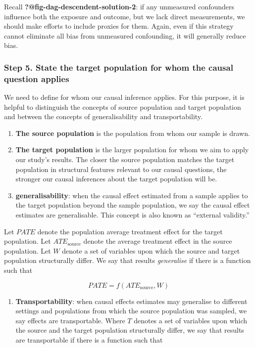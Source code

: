 \documentclass[
  singlecolumn]{article}
\providecommand{\tightlist}{%
  \setlength{\itemsep}{0pt}\setlength{\parskip}{0pt}}\usepackage{longtable,booktabs,array}
\begin{document}
Recall \textbf{?@fig-dag-descendent-solution-2}: if any unmeasured
confounders influence both the exposure and outcome, but we lack direct
measurements, we should make efforts to include proxies for them. Again,
even if this strategy cannot eliminate all bias from unmeasured
confounding, it will generally reduce bias.

\hypertarget{step-5.-state-the-target-population-for-whom-the-causal-question-applies}{%
\subsubsection{Step 5. State the target population for whom the causal
question
applies}\label{step-5.-state-the-target-population-for-whom-the-causal-question-applies}}

We need to define for whom our causal inference applies. For this
purpose, it is helpful to distinguish the concepts of source population
and target population and between the concepts of generalisability and
transportability.

\begin{enumerate}
\def\labelenumi{\arabic{enumi}.}
\item
  \textbf{The source population} is the population from whom our sample
  is drawn.
\item
  \textbf{The target population} is the larger population for whom we
  aim to apply our study's results. The closer the source population
  matches the target population in structural features relevant to our
  causal questions, the stronger our causal inferences about the target
  population will be.
\item
  \textbf{generalisability}: when the causal effect estimated from a
  sample applies to the target population beyond the sample population,
  we say the causal effect estimates are generalisable. This concept is
  also known as ``external validity.''
\end{enumerate}

Let \(PATE\) denote the population average treatment effect for the
target population. Let \(ATE_{\text{source}}\) denote the average
treatment effect in the source population. Let \(W\) denote a set of
variables upon which the source and target population structurally
differ. We say that results \emph{generalise} if there is a function
such that

\[PATE =  f(ATE_{\text{source}}, W)\]

\begin{enumerate}
\def\labelenumi{\arabic{enumi}.}
\setcounter{enumi}{3}
\tightlist
\item
  \textbf{Transportability}: when causal effects estimates may
  generalise to different settings and populations from which the source
  population was sampled, we say effects are transportable. Where \(T\)
  denotes a set of variables upon which the source and the target
  population structurally differ, we say that results are transportable
  if there is a function such that
\end{enumerate}
\end{document}
